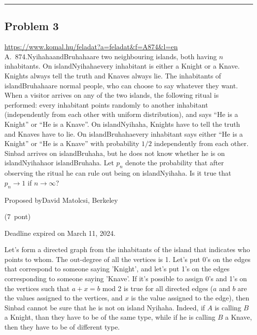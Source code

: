 \documentclass{article}
\begin{document}
\vspace{1em}
\hrule
\vspace{1em}

\subsection*{Problem 3}
\noindent\url{https://www.komal.hu/feladat?a=feladat&f=A874&l=en}\\[1em]

A. 874.NyihahaandBruhahaare two neighbouring islands, both having \(\displaystyle n\) inhabitants. On islandNyihahaevery inhabitant is either a Knight or a Knave. Knights always tell the truth and Knaves always lie. The inhabitants of islandBruhahaare normal people, who can choose to say whatever they want. When a visitor arrives on any of the two islands, the following ritual is performed: every inhabitant points randomly to another inhabitant (independently from each other with uniform distribution), and says ``He is a Knight'' or ``He is a Knave''. On islandNyihaha, Knights have to tell the truth and Knaves have to lie. On islandBruhahaevery inhabitant says either ``He is a Knight'' or ``He is a Knave'' with probability \(\displaystyle 1/2\) independently from each other. Sinbad arrives on islandBruhaha, but he does not know whether he is on islandNyihahaor islandBruhaha. Let \(\displaystyle p_n\) denote the probability that after observing the ritual he can rule out being on islandNyihaha. Is it true that \(\displaystyle p_n \to 1\) if \(\displaystyle n \to \infty\)?

Proposed byDavid Matolcsi, Berkeley

(7 pont)

Deadline expired on March 11, 2024.

Let's form a directed graph from the inhabitants of the island that indicates who points to whom. The out-degree of all the vertices is 1. Let's put 0's on the edges that correspond to someone saying 'Knight', and let's put 1's on the edges corresponding to someone saying 'Knave'. If it's possible to assign 0's and 1's on the vertices such that \(\displaystyle a+x=b\) mod 2 is true for all directed edges (\(\displaystyle a\) and \(\displaystyle b\) are the values assigned to the vertices, and \(\displaystyle x\) is the value assigned to the edge), then Sinbad cannot be sure that he is not on island Nyihaha. Indeed, if \(\displaystyle A\) is calling \(\displaystyle B\) a Knight, than they have to be of the same type, while if he is calling \(\displaystyle B\) a Knave, then they have to be of different type.
\end{document}
